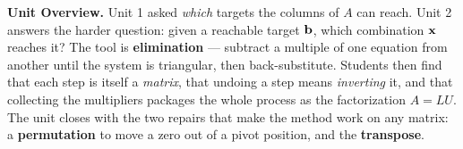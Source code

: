 %
%
\pagestyle{empty}


\vspace*{1.32in}

\begin{tcolorbox}[colback=blush,colframe=burgundy,boxrule=0.9pt,arc=2mm,
    left=4mm,right=4mm,top=3mm,bottom=3mm]
  \textbf{Unit Overview.}\quad
  Unit 1 asked \emph{which} targets the columns of $A$ can reach. Unit 2 answers the harder
  question: given a reachable target $\mathbf{b}$, which combination $\mathbf{x}$ reaches it? The tool is
  \textbf{elimination} --- subtract a multiple of one equation from another until the system is
  triangular, then back-substitute. Students then find that each step is itself a \emph{matrix},
  that undoing a step means \emph{inverting} it, and that collecting the multipliers packages
  the whole process as the factorization $A = LU$. The unit closes with the two repairs that
  make the method work on any matrix: a \textbf{permutation} to move a zero out of a pivot
  position, and the \textbf{transpose}.
\end{tcolorbox}

